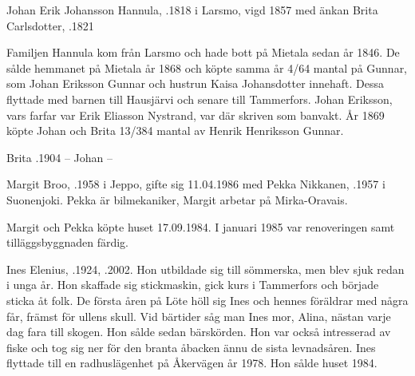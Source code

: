 Johan Erik Johansson Hannula, .1818 i Larsmo, vigd 1857 med änkan Brita Carlsdotter, .1821
\begin{jhchildren}
  \item {}
  \item {}
  \item {}
  \item {}
  \item {}
\end{jhchildren}
Familjen Hannula kom från Larsmo och hade bott på Mietala sedan år 1846. De sålde hemmanet på Mietala år 1868 och köpte samma år 4/64 mantal på Gunnar, som Johan Eriksson Gunnar och hustrun Kaisa Johansdotter innehaft. Dessa flyttade med barnen till Hausjärvi och senare till Tammerfors. Johan Eriksson, vars farfar var Erik Eliasson Nystrand, var där skriven som banvakt. År 1869 köpte Johan och Brita 13/384 mantal av Henrik Henriksson Gunnar.

Brita .1904  --  Johan --




Margit Broo, .1958 i Jeppo, gifte sig 11.04.1986 med Pekka Nikkanen, .1957 i Suonenjoki. Pekka är bilmekaniker, Margit arbetar på Mirka-Oravais.
\begin{jhchildren}
  \item {}
  \item {}
\end{jhchildren}
Margit och Pekka köpte huset 17.09.1984. I januari 1985 var renoveringen samt tilläggsbyggnaden färdig.


Ines Elenius, .1924, .2002. Hon utbildade sig till sömmerska, men blev sjuk redan i unga år. Hon skaffade sig stickmaskin, gick kurs i Tammerfors och började sticka åt folk. De första åren på Löte höll sig Ines och hennes föräldrar med några får, främst för ullens skull.
Vid bärtider såg man Ines mor, Alina, nästan varje dag fara till skogen. Hon sålde sedan bärskörden. Hon var också intresserad av fiske och tog sig ner för den branta åbacken ännu de sista levnadsåren. Ines flyttade till en radhuslägenhet på Åkervägen år 1978. Hon sålde huset 1984.


